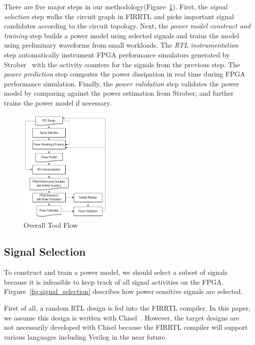 There are five major steps in our methodology(Figure~\ref{fig:tool_flow}).
First, the \emph{signal selection} step walks the circuit graph in FIRRTL\cite{Li:EECS-2016-9}
and picks important signal candidates according to the circuit topology. 
Next, the \emph{power model construct and training} step builds a power model 
using selected signals and trains the model using preliminary
waveforms from small workloads. The \emph{RTL instrumentation} step automatically
instrument FPGA performance simulators generated by Strober~\cite{Kim2016} with 
the activity counters for the signals from the previous step. 
The \emph{power prediction} step computes the power dissipation in real time
during FPGA performance simulation. Finally, the \emph{power validation} step
validates the power model by comparing against the power estimation from Strober,
and further trains the power model if necessary.

\begin{figure}[!ht]
	\centering
	\includegraphics[width=0.4\textwidth,height=\textheight,keepaspectratio]{images/tool_flow.pdf}
	\caption{Overall Tool Flow}
	\label{fig:tool_flow}
\end{figure}

\subsection{Signal Selection}
\label{sec:signal_selection}
To construct and train a power model, we should select a subset of signals
because it is infeasible to keep track of all signal activities on the FPGA.
Firgure~\ref{fig:signal_selection} describes how power sensitive signals
are selected.

First of all, a random RTL design is fed into the FIRRTL compiler.
In this paper, we assume this design is written with Chisel~\cite{Bachrach2012}.
However, the target designs are not necessarily developed with Chisel
because the FIRRTL compiler will support various languages including Verilog in the near future.

